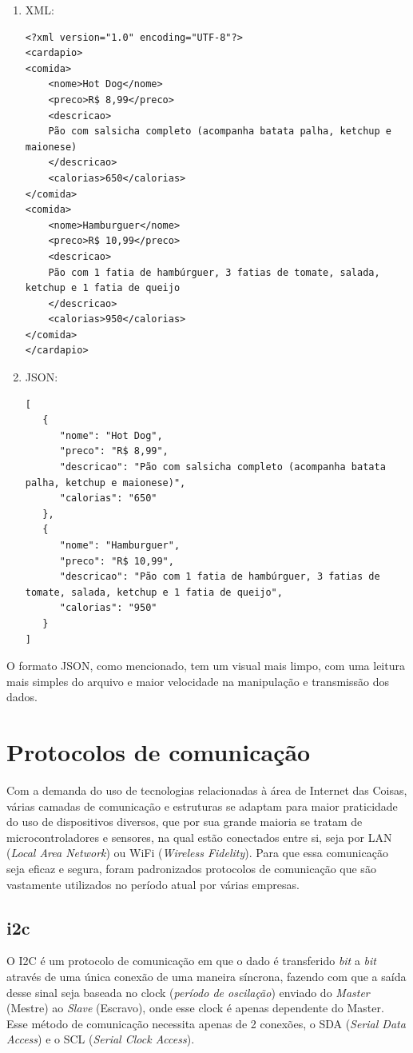 \documentclass[../../layout.tex]{subfiles}
\begin{document}
\begin{enumerate}[label=\alph*)]
\itemsep0em
  \item XML:
    \begin{verbatim}
<?xml version="1.0" encoding="UTF-8"?>
<cardapio>
<comida>
    <nome>Hot Dog</nome>
    <preco>R$ 8,99</preco>
    <descricao>
   	Pão com salsicha completo (acompanha batata palha, ketchup e maionese)
   	</descricao>
    <calorias>650</calorias>
</comida>
<comida>
    <nome>Hamburguer</nome>
    <preco>R$ 10,99</preco>
    <descricao>
    Pão com 1 fatia de hambúrguer, 3 fatias de tomate, salada, ketchup e 1 fatia de queijo
    </descricao>
    <calorias>950</calorias>
</comida>
</cardapio>
    \end{verbatim}
  
  \item JSON:
    \begin{verbatim}
[
   {
      "nome": "Hot Dog",
      "preco": "R$ 8,99",
      "descricao": "Pão com salsicha completo (acompanha batata palha, ketchup e maionese)",
      "calorias": "650"
   },
   {
      "nome": "Hamburguer",
      "preco": "R$ 10,99",
      "descricao": "Pão com 1 fatia de hambúrguer, 3 fatias de tomate, salada, ketchup e 1 fatia de queijo",
      "calorias": "950"
   }
]
    \end{verbatim}
\end{enumerate}

O formato JSON, como mencionado, tem um visual mais limpo, com uma leitura mais simples do arquivo e maior velocidade na manipulação e transmissão dos dados.
\section{Protocolos de comunicação}
\hspace*{3em}Com a demanda do uso de tecnologias relacionadas à área de Internet das Coisas, várias camadas de comunicação e estruturas se adaptam para maior praticidade do uso de dispositivos diversos, que por sua grande maioria se tratam de microcontroladores e sensores, na qual estão conectados entre si, seja por LAN (\emph{Local Area Network}) ou WiFi (\emph{Wireless Fidelity}). Para que essa comunicação seja eficaz e segura, foram padronizados protocolos de comunicação que são vastamente utilizados no período atual por várias empresas.

\subsection{i2c}
\hspace*{3em}O I2C é um protocolo de comunicação em que o dado é transferido \emph{bit} a \emph{bit} através de uma única conexão de uma maneira síncrona, fazendo com que a saída desse sinal seja baseada no clock (\emph{período de oscilação}) enviado do \emph{Master} (Mestre) ao \emph{Slave} (Escravo), onde esse clock é apenas dependente do Master. Esse método de comunicação necessita apenas de 2 conexões, o SDA (\emph{Serial Data Access}) e o SCL (\emph{Serial Clock Access}).
\end{document}

